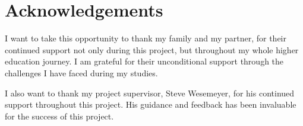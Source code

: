 \chapter*{Acknowledgements}
I want to take this opportunity to thank my family and my partner, for their continued support not only during this project, but throughout my whole higher education journey. I am grateful for their unconditional support through the challenges I have faced during my studies.

I also want to thank my project supervisor, Steve Wesemeyer, for his continued support throughout this project. His guidance and feedback has been invaluable for the success of this project.